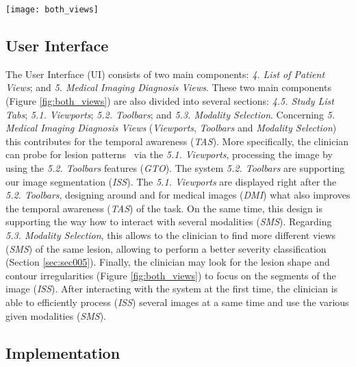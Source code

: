 \begin{figure*}[htbp]
\centering
\texttt{[image: both\_views]}
\caption{\scriptsize \textit{Single-Modality} (left) and \textit{Multi-Modality} (right) Views. The UI components are as follows: \textit{4. List of Patient Views}; and \textit{4.5. Study List Tabs}; as well as \textit{5. Medical Imaging Diagnosis Views}; \textit{5.1. Viewports}; \textit{5.2. Toolbars}; and \textit{5.3. Modality Selection}.}
\label{fig:both_views}
\end{figure*}


\subsection{User Interface}

The User Interface (UI) consists of two main components:
\textit{4. List of Patient Views}; and
\textit{5. Medical Imaging Diagnosis Views}.
These two main components (Figure \ref{fig:both_views}) are also divided into several sections:
\textit{4.5. Study List Tabs};
\textit{5.1. Viewports};
\textit{5.2. Toolbars}; and
\textit{5.3. Modality Selection}.
Concerning \textit{5. Medical Imaging Diagnosis Views} ({\em Viewports}, {\em Toolbars} and {\em Modality Selection}) this contributes for the temporal awareness (\textit{TAS}).
More specifically, the clinician can probe for lesion patterns~\cite{10.1007/978-3-030-00928-1_62} via the \textit{5.1. Viewports}, processing the image by using the \textit{5.2. Toolbars} features (\textit{GTO}).
The system \textit{5.2. Toolbars} are supporting our image segmentation (\textit{ISS}).
The \textit{5.1. Viewports} are displayed right after the \textit{5.2. Toolbars}, designing around and for medical images (\textit{DMI}) what also improves the temporal awareness (\textit{TAS}) of the task.
On the same time, this design is supporting the way how to interact with several modalities (\textit{SMS}).
Regarding \textit{5.3. Modality Selection}, this allows to the clinician to find more different views (\textit{SMS}) of the same lesion, allowing to perform a better severity classification (Section \ref{sec:sec005}).
Finally, the clinician may look for the lesion shape and contour irregularities (Figure \ref{fig:both_views}) to focus on the segments of the image (\textit{ISS}).
After interacting with the system at the first time, the clinician is able to efficiently process (\textit{ISS}) several images at a same time and use the various given modalities (\textit{SMS}).

\subsection{Implementation}


